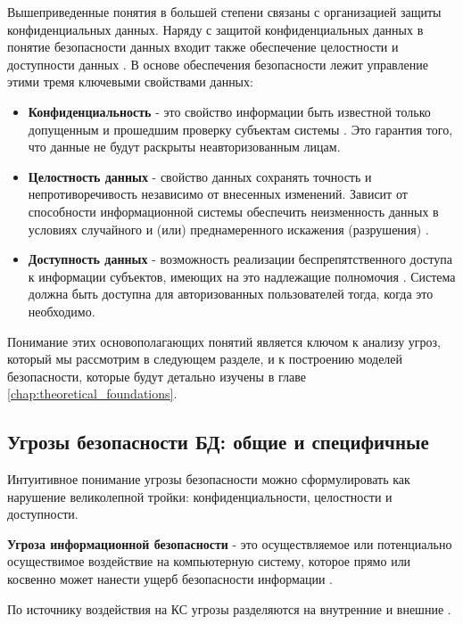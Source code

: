Вышеприведенные понятия в большей степени связаны с организацией защиты конфиденциальных данных. Наряду с защитой конфиденциальных данных в понятие безопасности данных входит также обеспечение целостности и доступности данных \autocite[сс. 15-18]{Skakun}. В основе обеспечения безопасности лежит управление этими тремя ключевыми свойствами данных:
\begin{itemize}
    \item \textbf{Конфиденциальность} - это свойство информации быть известной только допущенным и прошедшим проверку субъектам системы \autocite[сс. 15-18]{Skakun}. Это гарантия того, что данные не будут раскрыты неавторизованным лицам.
    \item \textbf{Целостность данных} - свойство данных сохранять точность и непротиворечивость независимо от внесенных изменений. Зависит от способности информационной системы обеспечить неизменность данных в условиях случайного и (или) преднамеренного искажения (разрушения) \autocite[сс. 15-18]{Skakun}.
    \item \textbf{Доступность данных} - возможность реализации беспрепятственного доступа к информации субъектов, имеющих на это надлежащие полномочия \autocite[сс. 15-18]{Skakun}. Система должна быть доступна для авторизованных пользователей тогда, когда это необходимо.
\end{itemize}

Понимание этих основополагающих понятий является ключом к анализу угроз, который мы рассмотрим в следующем разделе, и к построению моделей безопасности, которые будут детально изучены в главе \ref{chap:theoretical_foundations}.

\subsection{Угрозы безопасности БД: общие и специфичные}
Интуитивное понимание угрозы безопасности можно сформулировать как нарушение великолепной тройки: конфиденциальности, целостности и доступности. 
\begin{grayquote}
\textbf{Угроза информационной безопасности} - это осуществляемое или потенциально осуществимое воздействие на компьютерную систему, которое прямо или косвенно может нанести ущерб безопасности информации \autocite[с. 19]{Skakun}.
\end{grayquote}
По источнику воздействия на КС угрозы разделяются на внутренние и внешние \autocite{Ytebov2008}.

